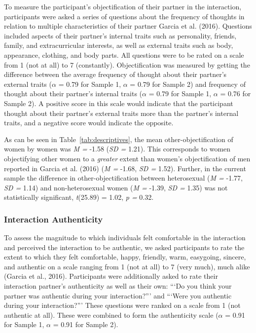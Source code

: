 \documentclass[man]{apa6}
\begin{document}
To measure the participant's objectification of their partner in the
interaction, participants were asked a series of questions about the
frequency of thoughts in relation to multiple characteristics of their
partner Garcia et al. (2016). Questions included aspects of their
partner's internal traits such as personality, friends, family, and
extracurricular interests, as well as external traits such as body,
appearance, clothing, and body parts. All questions were to be rated on
a scale from 1 (not at all) to 7 (constantly). Objectification was
measured by getting the difference between the average frequency of
thought about their partner's external traits (\(\alpha\) = 0.79 for
Sample 1, \(\alpha\) = 0.79 for Sample 2) and frequency of thought about
their partner's internal traits (\(\alpha\) = 0.79 for Sample 1,
\(\alpha\) = 0.76 for Sample 2). A positive score in this scale would
indicate that the participant thought about their partner's external
traits more than the partner's internal traits, and a negative score
would indicate the opposite.

As can be seen in Table~\ref{tab:descriptives}, the mean
other-objectification of women by women was \emph{M =} -1.58 (\emph{SD
=} 1.21). This corresponds to women objectifying other women to a
\emph{greater} extent than women's objectification of men reported in
Garcia et al. (2016) (\emph{M =} -1.68, \emph{SD =} 1.52). Further, in
the current sample the difference in other-objectification between
heterosexual (\emph{M =} -1.77, \emph{SD =} 1.14) and non-heterosexual
women (\emph{M =} -1.39, \emph{SD =} 1.35) was not statistically
significant, \emph{t}(25.89) = 1.02, \emph{p =} 0.32.

\subsubsection{Interaction Authenticity}\label{interaction-authenticity}

To assess the magnitude to which individuals felt comfortable in the
interaction and perceived the interaction to be authentic, we asked
participants to rate the extent to which they felt comfortable, happy,
friendly, warm, easygoing, sincere, and authentic on a scale ranging
from 1 (not at all) to 7 (very much), much alike (Garcia et al., 2016).
Participants were additionally asked to rate their interaction partner's
authenticity as well as their own: \enquote{`Do you think your partner
was authentic during your interaction?}' and \enquote{`Were you
authentic during your interaction?}' These questions were ranked on a
scale from 1 (not authentic at all). These were combined to form the
authenticity scale (\(\alpha\) = 0.91 for Sample 1, \(\alpha\) = 0.91
for Sample 2).
\end{document}
